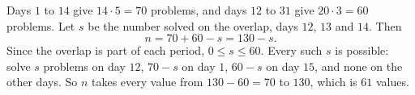 Days $1$ to $14$ give $14\cdot5=70$ problems, and days $12$ to $31$ give $20\cdot3=60$ problems. Let $s$ be the number solved on the overlap, days $12$, $13$ and $14$. Then
\[n=70+60-s=130-s .\]
Since the overlap is part of each period, $0\le s\le60$. Every such $s$ is possible: solve $s$ problems on day $12$, $70-s$ on day $1$, $60-s$ on day $15$, and none on the other days. So $n$ takes every value from $130-60=70$ to $130$, which is $\boxed{61}$ values.
